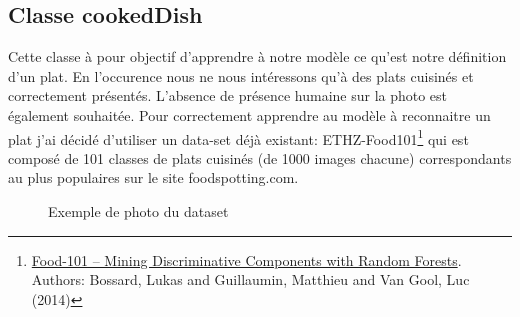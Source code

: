 \documentclass[a4paper,12pt]{report}
\begin{document}
      \subsection{Classe cookedDish}
      Cette classe à pour objectif d'apprendre à notre modèle ce qu'est notre définition d'un plat. En l'occurence nous ne nous intéressons qu'à des plats cuisinés et correctement présentés. L'absence de présence humaine sur la photo est également souhaitée.
      \medbreak
      Pour correctement apprendre au modèle à reconnaitre un plat j'ai décidé d'utiliser un data-set déjà existant: ETHZ-Food101\footnote{\href{<https://www.vision.ee.ethz.ch/datasets_extra/food-101/>}{Food-101 -- Mining Discriminative Components with Random Forests}. Authors: Bossard, Lukas and Guillaumin, Matthieu and Van Gool, Luc (2014)} qui est composé de 101 classes de plats cuisinés (de 1000 images chacune) correspondants au plus populaires sur le site foodspotting.com.
      \medbreak
      \begin{figure}[!h]%
        \centering
        \qquad
        \qquad
        \caption{Exemple de photo du dataset}%
      \end{figure}%
\end{document}

